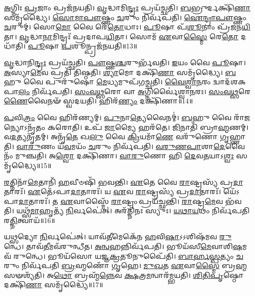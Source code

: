 \-\ul{𑌅}\-𑌗𑍍𑌨𑌿𑌃 \ul{𑌪𑍍𑌰}\-𑌜𑌾𑌂 𑌪𑍍𑌰𑌜᳴𑌨𑌯𑌤𑌿।
\-\ul{𑌵𑍃}\-𑌦𑍍𑌧𑌾𑌮𑌿\-\ul{𑌨𑍍𑌦𑍍𑌰𑌃} 𑌪𑍍𑌰𑌯᳴𑌚𑍍𑌛𑌤𑌿।
\-\ul{𑌬}\-𑌭𑍍𑌰𑍁𑌰𑍍𑌦𑌕𑍍𑌷𑌿᳴\-\ul{𑌣𑌾} 𑌸𑌮𑍃᳴𑌦𑍍𑌧𑍍𑌯𑍈।
\-\ul{𑌸𑍋}\-\-\ul{𑌮𑌾}\-\-\ul{𑌪𑍗}\-𑌷𑍍𑌣𑌂 \ul{𑌚}\-𑌰𑍁𑌂 𑌨𑌿𑌰𑍍𑌵᳴𑌪𑌤𑌿।
\-\ul{𑌐}\-\-\ul{𑌨𑍍𑌦𑍍𑌰𑌾}\-\-\ul{𑌪𑍗}\-𑌷𑍍𑌣𑌂 \ul{𑌚}\-𑌰𑍁𑌮𑍍।
𑌸𑍋\-\ul{𑌮𑍋} 𑌵𑍈 𑌰𑍇᳴\-\ul{𑌤𑍋}\-𑌧𑌾𑌃।
\-\ul{𑌪𑍂}\-𑌷𑌾 𑌪᳴\-\ul{𑌶𑍂}\-𑌨𑌾𑌂 𑌪𑍍𑌰᳴𑌜𑌨\-\ul{𑌯𑌿}\-𑌤𑌾।
\-\ul{𑌵𑍃}\-𑌦𑍍𑌧𑌾\-\ul{𑌨𑌾}\-𑌮𑌿𑌨𑍍𑌦𑍍𑌰𑌃᳴ 𑌪𑍍𑌰𑌦𑌾𑌪\-\ul{𑌯𑌿}\-𑌤𑌾।
𑌸𑍋𑌮᳴ \ul{𑌏}\-𑌵𑌾\-\ul{𑌸𑍍𑌮𑍈} 𑌰𑍇\-\ul{𑌤𑍋} 𑌦𑌧𑌾᳴𑌤𑌿।
\-\ul{𑌪𑍂}\-𑌷𑌾 \ul{𑌪}\-𑌶𑍂𑌨𑍍𑌪𑍍𑌰𑌜᳴𑌨𑌯𑌤𑌿॥13॥

\-\ul{𑌵𑍃}\-𑌦𑍍𑌧𑌾𑌨𑌿\-\ul{𑌨𑍍𑌦𑍍𑌰𑌃} 𑌪𑍍𑌰𑌯᳴𑌚𑍍𑌛𑌤𑌿।
\-\ul{𑌪𑍗}\-𑌷𑍍𑌣\-\ul{𑌶𑍍𑌚}\-𑌰𑍁𑌰𑍍𑌭᳴𑌵𑌤𑌿।
\-\ul{𑌇}\-𑌯𑌂 𑌵𑍈 \ul{𑌪𑍂}\-𑌷𑌾।
\-\ul{𑌅}\-𑌸𑍍𑌯𑌾\-\ul{𑌮𑍇}\-𑌵 𑌪𑍍𑌰𑌤𑌿᳴ 𑌤𑌿𑌷𑍍𑌠𑌤𑌿।
\-\ul{𑌶𑍍𑌯𑌾}\-𑌮𑍋 𑌦𑌕𑍍𑌷𑌿᳴\-\ul{𑌣𑌾} 𑌸𑌮𑍃᳴𑌦𑍍𑌧𑍍𑌯𑍈।
\-\ul{𑌬}\-𑌹𑍁 𑌵𑍈 𑌪𑍁𑌰𑍁᳴𑌷𑍋 \ul{𑌮𑍇}\-𑌧𑍍𑌯𑌮𑍁𑌪᳴𑌗𑌚𑍍𑌛𑌤𑌿।
\-\ul{𑌵𑍈}\-\-\ul{𑌶𑍍𑌵𑌾}\-\-\ul{𑌨}\-𑌰𑌂 𑌦𑍍𑌵𑌾𑌦᳴𑌶𑌕𑌪𑌾\-\ul{𑌲𑌂} 𑌨𑌿𑌰𑍍𑌵᳴𑌪𑌤𑌿।
\-\ul{𑌸𑌂}\-\-\ul{𑌵}\-\-\ul{𑌥𑍍𑌸}\-𑌰𑍋 𑌵𑌾 \ul{𑌅}\-𑌗𑍍𑌨𑌿𑌰𑍍𑌵𑍈॑𑌶𑍍𑌵𑌾\-\ul{𑌨}\-𑌰𑌃।
\-\ul{𑌸𑌂}\-\-\ul{𑌵}\-\-\ul{𑌥𑍍𑌸}\-𑌰𑍇\-\ul{𑌣𑍈}\-𑌵𑍈𑌨𑍟᳴ 𑌸𑍍𑌵𑌦𑌯𑌤𑌿।
𑌹𑌿𑌰᳴\-\ul{𑌣𑍍𑌯𑌂} 𑌦𑌕𑍍𑌷𑌿᳴𑌣𑌾॥14॥

\-\ul{𑌪}\-𑌵𑌿\-\ul{𑌤𑍍𑌰𑌂} 𑌵𑍈 𑌹𑌿𑌰᳴𑌣𑍍𑌯𑌮𑍍।
\-\ul{𑌪𑍁}\-𑌨𑌾\-\ul{𑌤𑍍𑌯𑍇}\-𑌵𑍈𑌨𑌮𑍍॑।
\-\ul{𑌬}\-𑌹𑍁 𑌵𑍈 𑌰𑌾᳴\-\ul{𑌜}\-𑌨𑍍𑌯𑍋\-𑌽𑌨𑍃᳴𑌤𑌂 𑌕𑌰𑍋𑌤𑌿।
𑌉𑌪᳴ \ul{𑌜𑌾}\-𑌮𑍍𑌯𑍈 𑌹𑌰᳴𑌤𑍇।
\-\ul{𑌜𑌿}\-𑌨𑌾𑌤𑌿᳴ 𑌬𑍍𑌰𑌾\-\ul{𑌹𑍍𑌮}\-𑌣𑌮𑍍।
𑌵\-\ul{𑌦}\-𑌤𑍍𑌯𑌨𑍃᳴𑌤𑌮𑍍।
𑌅𑌨𑍃᳴\-\ul{𑌤𑍇} 𑌖\-\ul{𑌲𑍁} 𑌵𑍈 \ul{𑌕𑍍𑌰𑌿}\-𑌯𑌮𑌾᳴\-\ul{𑌣𑍇} 𑌵𑌰𑍁᳴𑌣𑍋 𑌗𑍃𑌹𑍍𑌣𑌾𑌤𑌿।
\-\ul{𑌵𑌾}\-\-\ul{𑌰𑍁}\-𑌣𑌂 𑌯᳴\-\ul{𑌵}\-𑌮𑌯𑌂᳴ \ul{𑌚}\-𑌰𑍁𑌂 𑌨𑌿𑌰𑍍𑌵᳴𑌪𑌤𑌿।
\-\ul{𑌵}\-\-\ul{𑌰𑍁}\-\-\ul{𑌣}\-\-\ul{𑌪𑌾}\-𑌶𑌾\-\ul{𑌦𑍇}\-𑌵𑍈𑌨𑌂᳴ 𑌮𑍁𑌞𑍍𑌚𑌤𑌿।
𑌅\-\ul{𑌶𑍍𑌵𑍋} 𑌦𑌕𑍍𑌷𑌿᳴𑌣𑌾।
\-\ul{𑌵𑌾}\-\-\ul{𑌰𑍁}\-𑌣𑍋 𑌹𑌿 \ul{𑌦𑍇}\-𑌵\-\ul{𑌤}\-𑌯𑌾\-𑌽\-\ul{𑌶𑍍𑌵𑌃} 𑌸𑌮𑍃᳴𑌦𑍍𑌧𑍍𑌯𑍈॥15॥\anuvakamend[\-\ul{𑌐}\-\-\ul{𑌨𑍍𑌦𑍍𑌰𑌾}\-\-\ul{𑌵𑍈}\-\-\ul{𑌷𑍍𑌣}\-𑌵𑌮𑍇𑌕𑌾᳴\-𑌦𑌶\-𑌕𑌪𑌾\-\ul{𑌲𑌂} 𑌯𑌦𑍃᳴\-\ul{𑌷}\-𑌭𑍋 𑌦𑌧𑌾᳴𑌤𑌿 \ul{𑌪𑍂}\-𑌷𑌾 \ul{𑌪}\-𑌶𑍂𑌨𑍍𑌪𑍍𑌰𑌜᳴𑌨𑌯\-\ul{𑌤𑌿} 𑌹𑌿𑌰᳴\-\ul{𑌣𑍍𑌯𑌂} 𑌦𑌕𑍍𑌷𑌿᳴\-\ul{𑌣𑌾} 𑌦\-\ul{𑌕𑍍𑌷𑌿}\-𑌣𑍈𑌕𑌂᳴ 𑌚]

\-\ul{𑌰}\-𑌤𑍍𑌨𑌿𑌨𑌾᳴\-\ul{𑌮𑍇}\-𑌤𑌾𑌨𑌿᳴ \ul{𑌹}\-𑌵𑍀𑍞𑌷𑌿᳴ 𑌭𑌵𑌨𑍍𑌤𑌿।
\-\ul{𑌏}\-𑌤𑍇 𑌵𑍈 \ul{𑌰𑌾}\-𑌷𑍍𑌟𑍍𑌰𑌸𑍍𑌯᳴ 𑌪𑍍𑌰\-\ul{𑌦𑌾}\-𑌤𑌾𑌰𑌃᳴।
\-\ul{𑌏}\-𑌤𑍇᳴\-𑌽𑌪𑌾\-\ul{𑌦𑌾}\-𑌤𑌾𑌰𑌃᳴।
𑌯 \ul{𑌏}\-𑌵 \ul{𑌰𑌾}\-𑌷𑍍𑌟𑍍𑌰𑌸𑍍𑌯᳴ 𑌪𑍍𑌰\-\ul{𑌦𑌾}\-𑌤𑌾𑌰𑌃᳴।
𑌯𑍇᳴𑌽𑌪𑌾\-\ul{𑌦𑌾}\-𑌤𑌾𑌰𑌃᳴।
𑌤 \ul{𑌏}\-𑌵𑌾𑌸𑍍𑌮𑍈᳴ \ul{𑌰𑌾}\-𑌷𑍍𑌟𑍍𑌰𑌂 𑌪𑍍𑌰𑌯᳴𑌚𑍍𑌛𑌨𑍍𑌤𑌿।
\-\ul{𑌰𑌾}\-𑌷𑍍𑌟𑍍𑌰\-\ul{𑌮𑍇}\-𑌵 𑌭᳴𑌵𑌤𑌿।
𑌯𑌥𑍍𑌸᳴\-\ul{𑌮𑌾}\-𑌹𑍃𑌤𑍍𑌯᳴ \ul{𑌨𑌿}\-𑌰𑍍𑌵𑌪𑍇॑𑌤𑍍।
𑌅𑌰᳴𑌤𑍍𑌨𑌿𑌨𑌃 𑌸𑍍𑌯𑍁𑌃।
\-\ul{𑌯}\-\-\ul{𑌥𑌾}\-\-\ul{𑌯}\-𑌥𑌂 𑌨𑌿𑌰𑍍𑌵᳴𑌪𑌤𑌿 𑌰\-\ul{𑌤𑍍𑌨𑌿}\-𑌤𑍍𑌵𑌾𑌯᳴॥16॥

𑌯\-\ul{𑌥𑍍𑌸}\-𑌦𑍍𑌯𑍋 \ul{𑌨𑌿}\-𑌰𑍍𑌵𑌪𑍇॑𑌤𑍍।
𑌯𑌾𑌵᳴\-\ul{𑌤𑍀}\-𑌮𑍇𑌕𑍇᳴𑌨 \ul{𑌹}\-𑌵𑌿\-\ul{𑌷𑌾}\-\-𑌽𑌽𑌶𑌿𑌷᳴𑌮𑌵 \ul{𑌰𑍁}\-𑌨𑍍𑌧𑍇।
𑌤𑌾𑌵᳴\-\ul{𑌤𑍀}\-𑌮𑌵᳴𑌰𑍁𑌨𑍍𑌧𑍀𑌤।
\-\ul{𑌅}\-\-\ul{𑌨𑍍𑌵}\-𑌹𑌨𑍍𑌨𑌿𑌰𑍍𑌵᳴𑌪𑌤𑌿।
𑌭𑍂𑌯᳴𑌸𑍀\-\ul{𑌮𑍇}\-𑌵𑌾𑌶𑌿\-\ul{𑌷}\-𑌮𑌵᳴ 𑌰𑍁𑌨𑍍𑌧𑍇।
𑌭𑍂𑌯᳴𑌸𑍋 𑌯𑌜𑍍𑌞\-\ul{𑌕𑍍𑌰}\-𑌤𑍂𑌨𑍁𑌪𑍈᳴𑌤𑌿।
\-\ul{𑌬𑌾}\-\-\ul{𑌰𑍍}\-\-\ul{𑌹}\-\-\ul{𑌸𑍍𑌪}\-𑌤𑍍𑌯𑌂 \ul{𑌚}\-𑌰𑍁𑌂 𑌨𑌿𑌰𑍍𑌵᳴𑌪𑌤𑌿 \ul{𑌬𑍍𑌰}\-𑌹𑍍𑌮𑌣𑍋᳴ \ul{𑌗𑍃}\-𑌹𑍇।
\-\ul{𑌮𑍁}\-\-\ul{𑌖}\-𑌤 \ul{𑌏}\-𑌵𑌾\-\ul{𑌸𑍍𑌮𑍈} 𑌬𑍍𑌰\-\ul{𑌹𑍍𑌮} 𑌸𑍟𑌶𑍍𑌯᳴𑌤𑌿।
𑌅\-\ul{𑌥𑍋} 𑌬𑍍𑌰𑌹𑍍𑌮᳴\-\ul{𑌨𑍍𑌨𑍇}\-𑌵 \ul{𑌕𑍍𑌷}\-𑌤𑍍𑌰\-\ul{𑌮}\-𑌨𑍍𑌵𑌾𑌰᳴𑌮𑍍𑌭𑌯𑌤𑌿।
\-\ul{𑌶𑌿}\-\-\ul{𑌤𑌿}\-\-\ul{𑌪𑍃}\-𑌷𑍍𑌠𑍋 𑌦𑌕𑍍𑌷𑌿᳴\-\ul{𑌣𑌾} 𑌸𑌮𑍃᳴𑌦𑍍𑌧𑍍𑌯𑍈॥17॥

